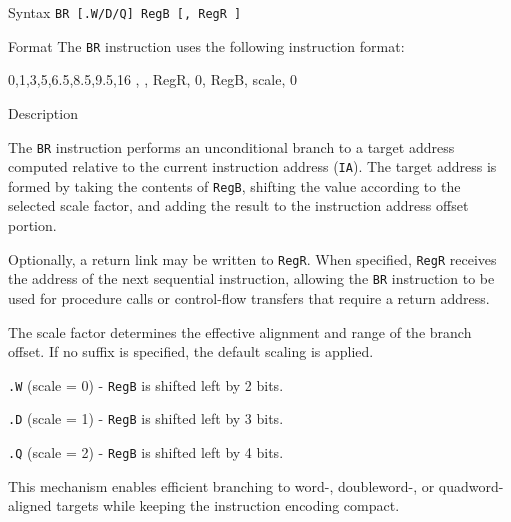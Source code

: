 \pagebreak
{}

\begin{iPageDescEntry}{Syntax}
\texttt{BR [.W/D/Q] RegB [, RegR ]}
\end{iPageDescEntry}

\begin{iPageDescEntry}{Format}
The \texttt{BR} instruction uses the following instruction format: \\

\begin{flushleft}
\drawInstrFormat
    {0,1,3,5,6.5,8.5,9.5,16}
    {\OpCodeGrpBR, \OpCodeBR, RegR, 0, RegB, scale, 0}
\end{flushleft}
\end{iPageDescEntry}

\begin{iPageDescEntry}{Description}

The \texttt{BR} instruction performs an unconditional branch to a target address computed relative to the current instruction address (\texttt{IA}). The target address is formed by taking the contents of \texttt{RegB}, shifting the value according to the selected scale factor, and adding the result to the instruction address offset portion.

Optionally, a return link may be written to \texttt{RegR}. When specified, \texttt{RegR} receives the address of the next sequential instruction, allowing the \texttt{BR} instruction to be used for procedure calls or control-flow transfers that require a return address.

The scale factor determines the effective alignment and range of the branch offset. If no suffix is specified, the default scaling is applied.

\begin{smallGapItemize}
    \item \texttt{.W} (scale = 0) - \texttt{RegB} is shifted left by 2 bits.
    \item \texttt{.D} (scale = 1) - \texttt{RegB} is shifted left by 3 bits.
    \item \texttt{.Q} (scale = 2) - \texttt{RegB} is shifted left by 4 bits.
\end{smallGapItemize}

This mechanism enables efficient branching to word-, doubleword-, or quadword- aligned targets while keeping the instruction encoding compact.

\end{iPageDescEntry}

